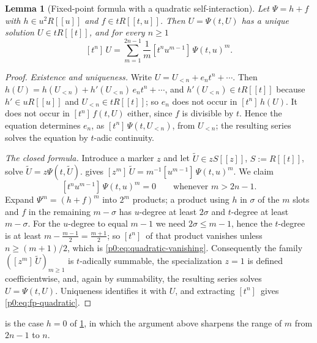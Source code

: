 \documentclass[11pt,a4paper,oneside]{book}
\theoremstyle{plain}
\newtheorem{lemma}[theorem]{Lemma}
\theoremstyle{definition}
\theoremstyle{remark}
\newcommand{\Coef}[1]{[#1]\,}
\begin{document}
\begin{lemma}[Fixed-point formula with a quadratic self-interaction]
\label{p0:lem:lagrange-fp-quadratic}
Let $\Psi=h+f$ with $h\in u^2R[[u]]$ and $f\in tR[[t,u]]$.  Then
$U=\Psi(t,U)$ has a unique solution $U\in tR[[t]]$, and for every $n\ge1$
\begin{equation}\label{p0:eq:fp-quadratic}
 \Coef{t^n}U=\sum_{m=1}^{2n-1}\frac1m\Coef{t^nu^{m-1}}\Psi(t,u)^m .
\end{equation}
\end{lemma}

\begin{proof}
\emph{Existence and uniqueness.}  Write $U=U_{<n}+e_nt^n+\cdots$.  Then
$h(U)=h(U_{<n})+h'(U_{<n})\,e_nt^n+\cdots$, and $h'(U_{<n})\in tR[[t]]$ because
$h'\in uR[[u]]$ and $U_{<n}\in tR[[t]]$; so $e_n$ does not occur in
$\Coef{t^n}h(U)$.  It does not occur in $\Coef{t^n}f(t,U)$ either, since $f$ is
divisible by $t$.  Hence the equation determines $e_n$, as
$\Coef{t^n}\Psi(t,U_{<n})$, from $U_{<n}$; the resulting series solves the
equation by $t$-adic continuity.

\emph{The closed formula.}  Introduce a marker $z$ and let
$\widetilde U\in zS[[z]]$, $S:=R[[t]]$, solve
$\widetilde U=z\Psi(t,\widetilde U)$.   gives
$\Coef{z^m}\widetilde U=m^{-1}\Coef{u^{m-1}}\Psi(t,u)^m$.  We claim
\begin{equation}\label{p0:eq:quadratic-vanishing}
 \Coef{t^nu^{m-1}}\Psi(t,u)^m=0\qquad\text{whenever } m>2n-1 .
\end{equation}
Expand $\Psi^m=(h+f)^m$ into $2^m$ products; a product using $h$ in $\sigma$ of
the $m$ slots and $f$ in the remaining $m-\sigma$ has $u$-degree at least
$2\sigma$ and $t$-degree at least $m-\sigma$.  For the $u$-degree to equal
$m-1$ we need $2\sigma\le m-1$, hence the $t$-degree is at least
$m-\tfrac{m-1}2=\tfrac{m+1}2$; so $\Coef{t^n}$ of that product vanishes unless
$n\ge(m+1)/2$, which is \eqref{p0:eq:quadratic-vanishing}.  Consequently the
family $(\Coef{z^m}\widetilde U)_{m\ge1}$ is $t$-adically summable, the
specialization $z=1$ is defined coefficientwise, and, again by summability, the
resulting series solves $U=\Psi(t,U)$.  Uniqueness identifies it with $U$, and
extracting $\Coef{t^n}$ gives \eqref{p0:eq:fp-quadratic}.
\end{proof}

 is the case $h=0$ of
\cref{p0:lem:lagrange-fp-quadratic}, in which the argument above sharpens the
range of $m$ from $2n-1$ to $n$.
\end{document}

